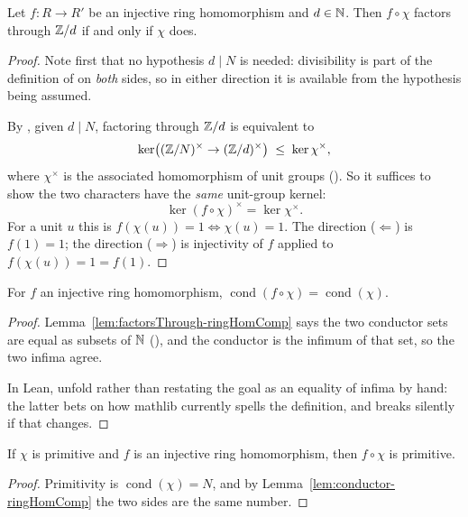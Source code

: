 \begin{lemma}
  \label{lem:factorsThrough-ringHomComp}
  \leanok
  Let $f \colon R \to R'$ be an injective ring homomorphism and $d \in \mathbb{N}$. Then
  $f \circ \chi$ factors through $\mathbb{Z}/d$ if and only if $\chi$ does.
\end{lemma}
\begin{proof}
  \leanok
  Note first that no hypothesis $d \mid N$ is needed: divisibility is part of the
  definition of  on \emph{both} sides, so in
  either direction it is available from the hypothesis being assumed.

  By , given $d \mid N$,
  factoring through $\mathbb{Z}/d$ is equivalent to
  \[ \ker\!\left( (\mathbb{Z}/N)^{\times} \to (\mathbb{Z}/d)^{\times} \right) \;\leq\; \ker \chi^{\times}, \]
  where $\chi^{\times}$ is the associated homomorphism of unit groups
  (). So it suffices to show the two characters have the
  \emph{same} unit-group kernel:
  \[ \ker (f \circ \chi)^{\times} = \ker \chi^{\times}. \]
  For a unit $u$ this is $f(\chi(u)) = 1 \iff \chi(u) = 1$. The direction
  ($\Leftarrow$) is $f(1) = 1$; the direction ($\Rightarrow$) is injectivity of $f$
  applied to $f(\chi(u)) = 1 = f(1)$.
\end{proof}

\begin{lemma}
  \label{lem:conductor-ringHomComp}
  \leanok
  For $f$ an injective ring homomorphism,
  $\operatorname{cond}(f \circ \chi) = \operatorname{cond}(\chi)$.
\end{lemma}
\begin{proof}
  \leanok
  Lemma~\ref{lem:factorsThrough-ringHomComp} says the two conductor sets are equal as
  subsets of $\mathbb{N}$ (), and the conductor is the infimum of that set, so the
  two infima agree.

  In Lean, unfold  rather than restating the goal as an
  equality of infima by hand: the latter bets on how mathlib currently spells the
  definition, and breaks silently if that changes.
\end{proof}

\begin{lemma}
  \label{lem:primitive-ringHomComp}
  \leanok
  If $\chi$ is primitive and $f$ is an injective ring homomorphism, then $f \circ \chi$
  is primitive.
\end{lemma}
\begin{proof}
  \leanok
  Primitivity is $\operatorname{cond}(\chi) = N$, and by
  Lemma~\ref{lem:conductor-ringHomComp} the two sides are the same number.
\end{proof}

